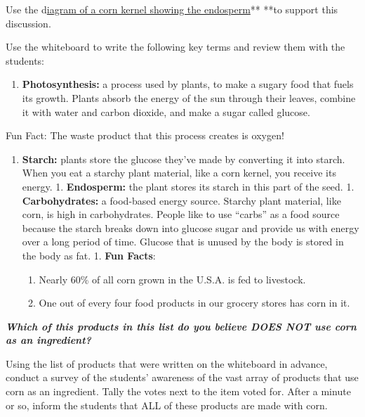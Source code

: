 \documentclass[12pt,]{article}
\providecommand{\tightlist}{%
  \setlength{\itemsep}{0pt}\setlength{\parskip}{0pt}}
\begin{document}
Use the d\href{http://media.web.britannica.com/eb-media/54/166754-050-8DEB8E13.jpg}{iagram of a corn kernel showing the endosperm}** **to support this discussion.

Use the whiteboard to write the following key terms and review them with the students:

\begin{enumerate}
\def\labelenumi{\arabic{enumi}.}
\tightlist
\item
  \textbf{Photosynthesis:} a process used by plants, to make a sugary food that fuels its growth. Plants absorb the energy of the sun through their leaves, combine it with water and carbon dioxide, and make a sugar called glucose.
\end{enumerate}

Fun Fact: The waste product that this process creates is oxygen!

\begin{enumerate}
\def\labelenumi{\arabic{enumi}.}
\tightlist
\item
  \textbf{Starch:} plants store the glucose they've made by converting it into starch. When you eat a starchy plant material, like a corn kernel, you receive its energy.
  1. \textbf{Endosperm:} the plant stores its starch in this part of the seed.
  1. \textbf{Carbohydrates:} a food-based energy source. Starchy plant material, like corn, is high in carbohydrates. People like to use ``carbs'' as a food source because the starch breaks down into glucose sugar and provide us with energy over a long period of time. Glucose that is unused by the body is stored in the body as fat.
  1. \textbf{Fun Facts}:

  \begin{enumerate}
  \def\labelenumii{\arabic{enumii}.}
  \tightlist
  \item
    Nearly 60\% of all corn grown in the U.S.A. is fed to livestock.
  \item
    One out of every four food products in our grocery stores has corn in it.
  \end{enumerate}
\end{enumerate}

\textbf{\emph{Which of this products in this list do you believe DOES NOT use corn as an ingredient? }}

Using the list of products that were written on the whiteboard in advance, conduct a survey of the students' awareness of the vast array of products that use corn as an ingredient. Tally the votes next to the item voted for. After a minute or so, inform the students that ALL of these products are made with corn.
\end{document}
